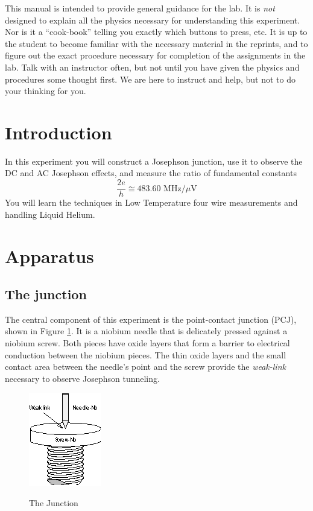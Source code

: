 \documentclass{../lab}
\begin{document}
This manual is intended to provide general guidance for the lab. It is \emph{not} designed to explain all the physics necessary for understanding this experiment. Nor is it a ``cook-book'' telling you exactly which buttons to press, etc. It is up to the student to become familiar with the necessary material in the reprints, and to figure out the exact procedure necessary for completion of the assignments in the lab. Talk with an instructor often, but not until you have given the physics and procedures some thought first. We are here to instruct and help, but not to do your thinking for you.

\section{Introduction}

In this experiment you will construct a Josephson junction, use it to observe the DC and AC Josephson effects, and measure the ratio of fundamental constants
\begin{equation}
    \frac{2e}{h} \cong 483.60 \textrm{ MHz}/\mu \textrm{V}
\end{equation}
You will learn the techniques in Low Temperature four wire measurements and handling Liquid Helium.

\section{Apparatus}

\subsection{The junction}

The central component of this experiment is the point-contact junction (PCJ), shown in Figure \ref{fig:junction}. It is a niobium needle that is delicately pressed against a niobium screw. Both pieces have oxide layers that form a barrier to electrical conduction between the niobium pieces. The thin oxide layers and the small contact area between the needle's point and the screw provide the \emph{weak-link} necessary to observe Josephson tunneling.

\begin{figure}[h]
    \centering
    \href{http://experimentationlab.berkeley.edu/sites/default/files/images/JOS4.gif}{\includegraphics[width=0.3\linewidth]{images/JOS4.png}}
    \caption{The Junction}
    \label{fig:junction}
\end{figure}
\end{document}
